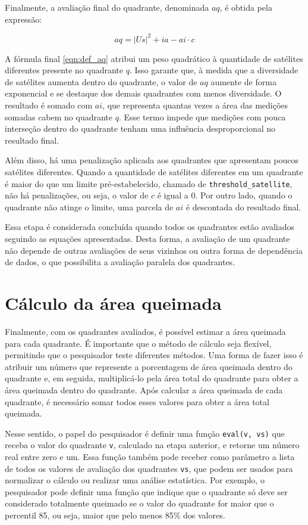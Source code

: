 \documentclass[cic,tc]{iiufrgs}
\begin{document}
Finalmente, a avaliação final do quadrante, denominada $aq$, é obtida pela expressão:

\begin{equation} \label{eqn:def_aq}
aq = |Us|^2 + ia - ai \cdot c
\end{equation}

A fórmula final \ref{eqn:def_aq} atribui um peso quadrático à quantidade de satélites diferentes presente no quadrante $q$. Isso garante que, à medida que a diversidade de satélites aumenta dentro do quadrante, o valor de $aq$ aumente de forma exponencial e se destaque dos demais quadrantes com menos diversidade. O resultado é somado com $ai$, que representa quantas vezes a área das medições somadas cabem no quadrante $q$. Esse termo impede que medições com pouca interseção dentro do quadrante tenham uma influência desproporcional no resultado final.

Além disso, há uma penalização aplicada aos quadrantes que apresentam poucos satélites diferentes. Quando a quantidade de satélites diferentes em um quadrante é maior do que um limite pré-estabelecido, chamado de \texttt{threshold\_satellite}, não há penalizações, ou seja, o valor de $c$ é igual a 0. Por outro lado, quando o quadrante não atinge o limite, uma parcela de $ai$ é descontada do resultado final. 

Essa etapa é considerada concluída quando todos os quadrantes estão avaliados seguindo as equações apresentadas. Desta forma, a avaliação de um quadrante não depende de outras avaliações de seus vizinhos ou outra forma de dependência de dados, o que possibilita a avaliação paralela dos quadrantes.

\section{Cálculo da área queimada}
\label{sec:calculo_area_queimada}

Finalmente, com os quadrantes avaliados, é possível estimar a área queimada para cada quadrante. É importante que o método de cálculo seja flexível, permitindo que o pesquisador teste diferentes métodos. Uma forma de fazer isso é atribuir um número que represente a porcentagem de área queimada dentro do quadrante e, em seguida, multiplicá-lo pela área total do quadrante para obter a área queimada dentro do quadrante. Após calcular a área queimada de cada quadrante, é necessário somar todos esses valores para obter a área total queimada.

Nesse sentido, o papel do pesquisador é definir uma função \texttt{eval(v, vs)} que receba o valor do quadrante \texttt{v}, calculado na etapa anterior, e retorne um número real entre zero e um. Essa função também pode receber como parâmetro a lista de todos os valores de avaliação dos quadrantes \texttt{vs}, que podem ser usados para normalizar o cálculo ou realizar uma análise estatística. Por exemplo, o pesquisador pode definir uma função que indique que o quadrante só deve ser considerado totalmente queimado se o valor do quadrante for maior que o percentil 85, ou seja, maior que pelo menos 85\% dos valores.
\end{document}
